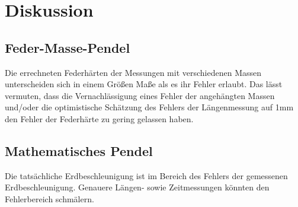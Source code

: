 \section{Diskussion}


\subsection{Feder-Masse-Pendel}
Die errechneten Federhärten der Messungen mit verschiedenen Massen unterscheiden sich in einem Größen Maße als es ihr Fehler erlaubt. Das lässt vermuten, dass die Vernachlässigung eines Fehler der angehängten Massen und/oder die optimistische Schätzung des Fehlers der Längenmessung auf 1mm den Fehler der Federhärte zu gering gelassen haben.
\subsection{Mathematisches Pendel}
Die tatsächliche Erdbeschleunigung ist im Bereich des Fehlers der gemessenen Erdbeschleunigung. Genauere Längen- sowie Zeitmessungen könnten den Fehlerbereich schmälern.